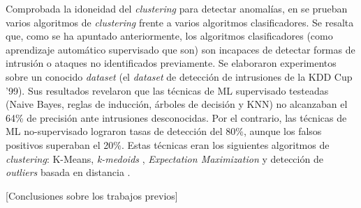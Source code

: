 Comprobada la idoneidad del \emph{clustering} para detectar anomalías, en \cite{Syarif_2012} se prueban varios algoritmos de \emph{clustering} frente a varios algoritmos clasificadores.
Se resalta que, como se ha apuntado anteriormente, los algoritmos clasificadores (como aprendizaje automático supervisado que son) son incapaces de detectar formas de intrusión o ataques no identificados previamente.
Se elaboraron experimentos sobre un conocido \emph{dataset} (el \emph{dataset} de detección de intrusiones de la KDD Cup '99).
Sus resultados revelaron que las técnicas de ML supervisado testeadas (Naive Bayes, reglas de inducción, árboles de decisión y KNN) no alcanzaban el 64\% de precisión ante intrusiones desconocidas.
Por el contrario, las técnicas de ML no-supervisado lograron tasas de detección del 80\%, aunque los falsos positivos superaban el 20\%.
Estas técnicas eran los siguientes algoritmos de \emph{clustering}: K-Means, \emph{k-medoids} \cite{Velmurugan_2010}, \emph{Expectation Maximization} \cite{Lu_2009} y detección de \emph{outliers} basada en distancia \cite{Orair_2010}.

[Conclusiones sobre los trabajos previos]
